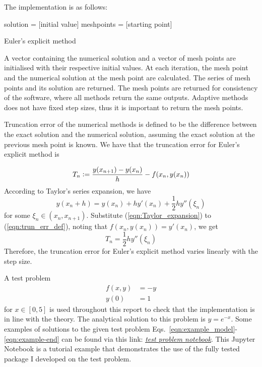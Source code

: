 The implementation is as follows:

\begin{algorithm}[H]
    \SetAlgoLined
    solution = [initial value]\;
    meshpoints = [starting point]\;
    \;
\caption{Euler's explicit method}
\end{algorithm}

A vector containing the numerical solution and a vector of mesh points are initialised with their respective initial values. At each iteration, the mesh point and the numerical solution at the mesh point are calculated. The series of mesh points and its solution are returned. The mesh points are returned for consistency of the software, where all methods return the same outputs. Adaptive methods does not have fixed step sizes, thus it is important to return the mesh points. 

Truncation error of the numerical methods is defined to be the difference between the exact solution and the numerical solution, assuming the exact solution at the previous mesh point is known. We have that the truncation error for Euler's explicit method is

\begin{equation}
\label{eqn:trun_err_def}
    T_n \vcentcolon= \frac{y(x_{n+1}) - y(x_{n})}{h} - f(x_n, y(x_n))
\end{equation}
According to Taylor's series expansion, we have 
\begin{equation}
\label{eqn:Taylor_expansion}
    y(x_n + h) = y(x_n) + hy'(x_n) + \frac{1}{2}hy''(\xi_n)
\end{equation}
for some $\xi_n \in (x_n, x_{n+1})$. Substitute (\ref{eqn:Taylor_expansion}) to (\ref{eqn:trun_err_def}), noting that $f(x_n, y(x_n)) = y'(x_n)$, we get
\begin{equation}
    T_n = \frac{1}{2}hy''(\xi_n)
\end{equation}
Therefore, the truncation error for Euler's explicit method varies linearly with the step size.

A test problem
\begin{align}
\label{eqn:example_model}
    f(x,y) &= -y \\
    y(0) &= 1 \label{eqn:example-end}
\end{align}
for $x \in [0, 5]$ is used throughout this report to check that the implementation is in line with the theory. The analytical solution to this problem is $y = e^{-x}$. Some examples of solutions to the given test problem Eqs.~\eqref{eqn:example_model}-\eqref{eqn:example-end} can be found via this link: \href{https://nbviewer.jupyter.org/github/FarmHJ/numerical-solver/blob/main/examples/solver_convergence.ipynb}{\underline{\emph{test problem notebook}}}. This Jupyter Notebook is a tutorial example that demonstrates the use of the fully tested package I developed on the test problem.

